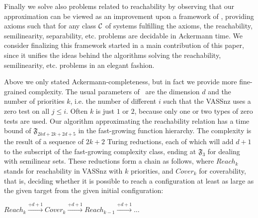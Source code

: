 Finally we solve also problems related to reachability by observing that our approximation can be viewed as an improvement upon a framework of \cite{GuttenbergRE23}, providing axioms such that for any class \(\mathcal{C}\) of systems fulfilling the axioms, the reachability, semilinearity, separability, etc. problems are decidable in Ackermann time. We consider finalizing this framework started in \cite{GuttenbergRE23} a main contribution of this paper, since it unifies the ideas behind the algorithms solving the reachability, semilinearity, etc. problems in an elegant fashion.


Above we only stated Ackermann-completeness, but in fact we provide more fine-grained complexity. The usual parameters of \ConsideredModel \ are the dimension \(d\) and the number of priorities \(k\), i.e. the number of different \(i\) such that the VASSnz uses a zero test on all \(j \leq i\). Often \(k\) is just \(1\) or \(2\), because only one or two types of zero tests are used. Our algorithm approximating the reachability relation has a time bound of \(\mathfrak{F}_{2kd+2k+2d+5}\) in the fast-growing function hierarchy. The complexity is the result of a sequence of \(2k+2\) Turing reductions, each of which will add \(d+1\) to the subscript of the fast-growing complexity class, ending at \(\mathfrak{F}_{3}\) for dealing with semilinear sets. These reductions form a chain as follows, where \(Reach_k\) stands for reachability in VASSnz with \(k\) priorities, and \(Cover_k\) for coverability, that is, deciding whether it is possible to reach a configuration at least as large as the given target from the given initial configuration: 

\(Reach_k \xrightarrow{+d+1} Cover_k \xrightarrow{+d+1} Reach_{k-1} \xrightarrow{+d+1} \dots\)

